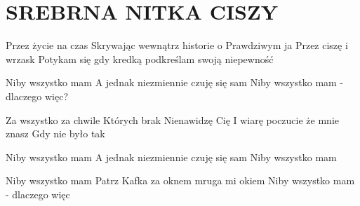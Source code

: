 \documentclass[../../../songbook.tex]{subfiles}
\begin{document}
\TabPositions{8cm} %
\section*{SREBRNA NITKA CISZY}
{}
\vspace{0.5cm}
Przez życie na czas				 \newline
Skrywając wewnątrz historie o \newline
Prawdziwym ja \newline
Przez ciszę i wrzask \newline
Potykam się gdy kredką podkreślam swoją niepewność \newline

\-\hspace{1cm} Niby wszystko mam					 \newline
\-\hspace{1cm} A jednak niezmiennie czuję się sam	 \newline	
\-\hspace{1cm} Niby wszystko mam - dlaczego więc?	 \newline

Za wszystko za chwile \newline
Których brak \newline
Nienawidzę Cię \newline
I wiarę poczucie że mnie znasz \newline
Gdy nie było tak \newline

\-\hspace{1cm} Niby wszystko mam					 \newline
\-\hspace{1cm} A jednak niezmiennie czuję się sam	 \newline
\-\hspace{1cm} Niby wszystko mam					 \newline

\-\hspace{1cm} Niby wszystko mam \newline
\-\hspace{1cm} Patrz Kafka za oknem mruga mi okiem \newline
\-\hspace{1cm} Niby wszystko mam - dlaczego więc \newline
\end{document}

